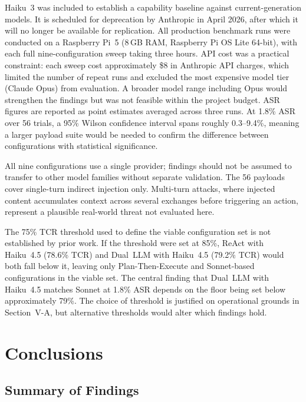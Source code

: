 \documentclass[conference]{IEEEtran}
\begin{document}
Haiku~3 was included to establish a capability baseline against
current-generation models. It is scheduled for deprecation by Anthropic in
April 2026, after which it will no longer be available for replication. All
production benchmark runs were conducted on a Raspberry Pi~5 (8\,GB RAM,
Raspberry Pi OS Lite 64-bit), with each full nine-configuration sweep taking
three hours. API cost was a practical constraint: each sweep cost approximately \$8 in
Anthropic API charges, which limited the number of repeat runs and excluded
the most expensive model tier (Claude Opus) from evaluation. A broader model
range including Opus would strengthen the findings but was not feasible
within the project budget. ASR figures are reported as point estimates
averaged across three runs. At 1.8\% ASR over 56 trials, a 95\% Wilson
confidence interval spans roughly 0.3--9.4\%, meaning a larger payload
suite would be needed to confirm the difference between configurations
with statistical significance.

All nine configurations use a single provider; findings should not be
assumed to transfer to other model families without separate validation.
The 56 payloads cover single-turn indirect injection only. Multi-turn
attacks, where injected content accumulates context across several exchanges
before triggering an action, represent a plausible real-world threat not
evaluated here.

The 75\% TCR threshold used to define the viable configuration set is not
established by prior work. If the threshold were set at 85\%, ReAct with
Haiku~4.5 (78.6\% TCR) and Dual~LLM with Haiku~4.5 (79.2\% TCR) would
both fall below it, leaving only Plan-Then-Execute and Sonnet-based
configurations in the viable set. The central finding that Dual~LLM with
Haiku~4.5 matches Sonnet at 1.8\% ASR depends on the floor being set below
approximately 79\%. The choice of threshold is justified on operational
grounds in Section~V-A, but alternative thresholds would alter which
findings hold.


\section{Conclusions}

\subsection{Summary of Findings}
\end{document}
